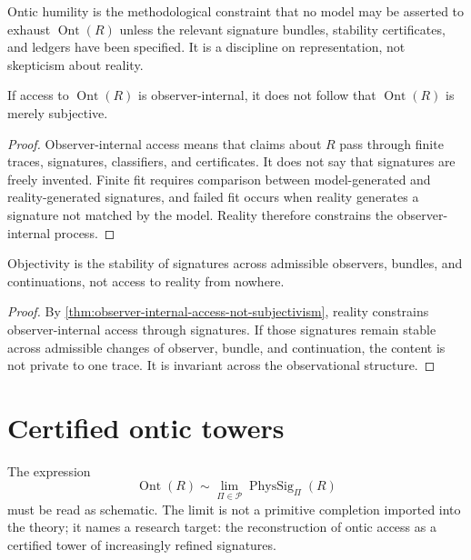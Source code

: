 \begin{definition}
\label{def:ontic-humility}
Ontic humility is the methodological constraint that no model may be asserted to exhaust $\operatorname{Ont}(R)$ unless the relevant signature bundles, stability certificates, and ledgers have been specified. It is a discipline on representation, not skepticism about reality.
\end{definition}

\begin{theorem}
\label{thm:observer-internal-access-not-subjectivism}
If access to $\operatorname{Ont}(R)$ is observer-internal, it does not follow that $\operatorname{Ont}(R)$ is merely subjective.
\end{theorem}

\begin{proof}
Observer-internal access means that claims about $R$ pass through finite traces, signatures, classifiers, and certificates. It does not say that signatures are freely invented. Finite fit requires comparison between model-generated and reality-generated signatures, and failed fit occurs when reality generates a signature not matched by the model. Reality therefore constrains the observer-internal process.
\end{proof}

\begin{corollary}
\label{cor:objectivity-invariant-signature-stability}
Objectivity is the stability of signatures across admissible observers, bundles, and continuations, not access to reality from nowhere.
\end{corollary}

\begin{proof}
By \autoref{thm:observer-internal-access-not-subjectivism}, reality constrains observer-internal access through signatures. If those signatures remain stable across admissible changes of observer, bundle, and continuation, the content is not private to one trace. It is invariant across the observational structure.
\end{proof}

\section{Certified ontic towers}
\label{sec:certified-ontic-towers}

The expression
$$
\operatorname{Ont}(R)
\sim
\lim_{\Pi\in\mathcal P}
\operatorname{PhysSig}_{\Pi}(R)
$$
must be read as schematic. The limit is not a primitive completion imported into the theory; it names a research target: the reconstruction of ontic access as a certified tower of increasingly refined signatures.


